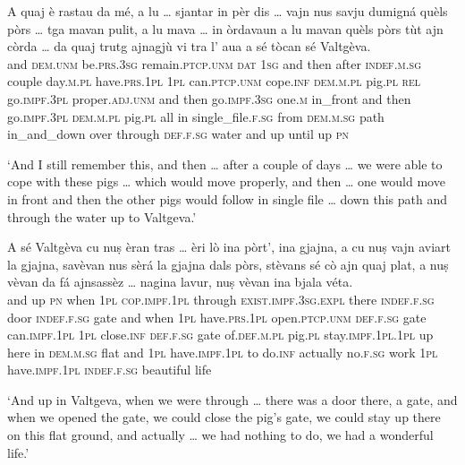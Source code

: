 \begin{linenumbers}
	\gll    A quaj è rastau da mé, a lu … sjantar in pèr dis … vajn nus savju dumigná quèls pòrs … tga mavan pulit, a lu mava … in òrdavaun a lu mavan quèls pòrs tùt ajn còrda … da quaj trutg ajnagjù vi tra l' aua a sé tòcan sé Valtgèva.\\
	and \textsc{dem.unm} be.\textsc{prs.3sg} remain.\textsc{ptcp.unm}  \textsc{dat}  \textsc{1sg} and then {} after \textsc{indef.m.sg} couple  day.\textsc{m.pl} {} have.\textsc{prs.1pl} \textsc{1pl} can.\textsc{ptcp.unm} cope.\textsc{inf} \textsc{dem.m.pl} pig.\textsc{pl} {} \textsc{rel}  go.\textsc{impf.3pl} proper.\textsc{adj.unm} and then go.\textsc{impf.3sg} {} one.\textsc{m} in\_front and then go.\textsc{impf.3pl} \textsc{dem.m.pl} pig.\textsc{pl} all in single\_file.\textsc{f.sg} {} from \textsc{dem.m.sg} path in\_and\_down over through \textsc{def.f.sg} water and up until up \textsc{pn} \\
\end{linenumbers}
\medskip
\glt `And I still remember this, and then … after a couple of days … we were able to cope with these pigs … which would move properly, and then … one would move in front and then the other pigs would follow in single file … down this path and through the water up to Valtgeva.'
\medskip

\begin{linenumbers}
	\gll    A sé Valtgèva cu nuṣ èran tras … èri lò ina pòrt’, ina gjajna, a cu nuṣ vajn aviart la gjajna, savèvan nus sèrá la gjajna dals pòrs, stèvans sé cò ajn quaj plat, a nuṣ vèvan da fá ajnsassèz … nagina lavur, nuṣ vèvan ina bjala véta.\\
	and up \textsc{pn} when \textsc{1pl} \textsc{cop.impf.1pl} through {} \textsc{exist.impf.3sg.expl} there \textsc{indef.f.sg} door \textsc{indef.f.sg} gate and when \textsc{1pl} have.\textsc{prs.1pl}  open.\textsc{ptcp.unm}  \textsc{def.f.sg} gate can.\textsc{impf.1pl}  \textsc{1pl}  close.\textsc{inf}  \textsc{def.f.sg} gate of.\textsc{def.m.pl} pig.\textsc{pl} stay.\textsc{impf.1pl.1pl} up here in \textsc{dem.m.sg} flat and \textsc{1pl} have.\textsc{impf.1pl} to  do.\textsc{inf} actually {} no.\textsc{f.sg} work \textsc{1pl} have.\textsc{impf.1pl} \textsc{indef.f.sg} beautiful life\\
\end{linenumbers}
\medskip
\glt `And up in Valtgeva, when we were through … there was a door there, a gate, and when we opened the gate, we could close the pig’s gate, we could stay up there on this flat ground, and actually … we had nothing to do, we had a wonderful life.'
\medskip

